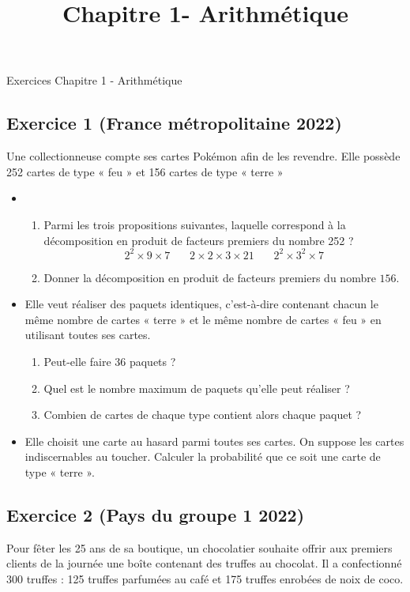 \documentclass[14 pt]{extarticle}
\title{Chapitre 1-  Arithmétique}
\date{}
\theoremstyle{plain}
\begin{document}
\begin{center}{\Large Exercices Chapitre 1 - Arithmétique}\\ 
 \end{center}
 
 \subsection*{Exercice 1 (France métropolitaine 2022)}
 
 Une collectionneuse compte ses cartes Pokémon afin de les revendre.
Elle possède 252 cartes de type « feu » et 156 cartes de type « terre »
\begin{itemize}
\item[1.]\begin{enumerate}\item Parmi les trois propositions suivantes, laquelle correspond à la décomposition en produit de facteurs premiers du nombre 252 ? 
\[ 2^2 \times 9 \times 7 \ \ \ \ \ \ \ \ 2 \times 2 \times 3
\times 21 \ \ \ \ \ \ \ \ 2^2\times 3^2\times 7\]
\item Donner la décomposition en produit de facteurs premiers du nombre $156$.
\end{enumerate}
\item[2.] Elle veut réaliser des paquets identiques, c’est-à-dire contenant chacun le même nombre
de cartes « terre » et le même nombre de cartes « feu » en utilisant toutes ses cartes.
\begin{enumerate}
\item Peut-elle faire 36 paquets ?
\item  Quel est le nombre maximum de paquets qu’elle peut réaliser ?
\item Combien de cartes de chaque type contient alors chaque paquet ?
\end{enumerate}


\item[3.] Elle choisit une carte au hasard parmi toutes ses cartes. On suppose les cartes indiscernables au toucher.
Calculer la probabilité que ce soit une carte de type « terre ».
\end{itemize}


 \subsection*{Exercice 2 (Pays du groupe 1 2022)}
 

 
 Pour fêter les 25 ans de sa boutique, un chocolatier souhaite offrir aux premiers clients de la journée une
boîte contenant des truffes au chocolat. Il a confectionné 300 truffes : 125 truffes parfumées au café et 175 truffes enrobées de noix de coco. 
\end{document}
